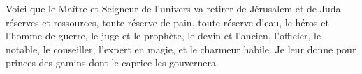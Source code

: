 Voici que le Maître et Seigneur de l’univers
	va retirer de Jérusalem et de Juda réserves et ressources,
	toute réserve de pain, toute réserve d’eau,
	le héros et l’homme de guerre, le juge et le prophète,
	le devin et l’ancien, l’officier, le notable, le conseiller,
	l’expert en magie, et le charmeur habile.
Je leur donne pour princes des gamins dont le caprice les gouvernera.
